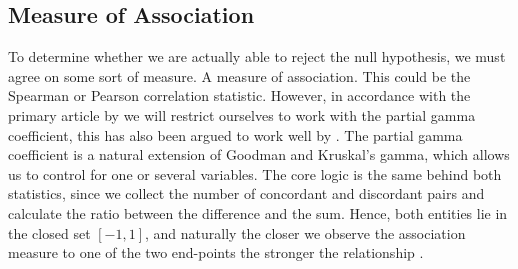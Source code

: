 \documentclass[a4project,12pt]{article}
\theoremstyle{examplestyle}
\theoremstyle{defstyle}
\theoremstyle{thmstyle}
\begin{document}
\subsection{Measure of Association}
To determine whether we are actually able to reject the null hypothesis, we must agree on some sort of measure. A measure of association. This could be the Spearman or Pearson correlation statistic. However, in accordance with the primary article by \citet{Kreiner_Christensen_2011} we will restrict ourselves to work with the partial gamma coefficient, this has also been argued to work well by \cite{Kreiner2013c_local_dependece_test}. The partial gamma coefficient is a natural extension of Goodman and Kruskal's gamma, which allows us to control for one or several variables. The core logic is the same behind both statistics, since we collect the number of concordant and discordant pairs and calculate the ratio between the difference and the sum. Hence, both entities lie in the closed set $[-1,1]$, and naturally the closer we observe the association measure to one of the two end-points the stronger the relationship \cite{agresti1984analysis}.
\end{document}
